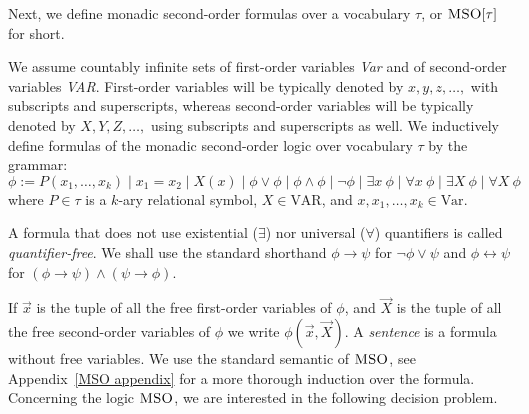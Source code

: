 \documentclass[a4paper,UKenglish,cleveref, autoref, thm-restate]{lipics-v2021}
\newcommand{\MSO}{\textsc{MSO}}
\begin{document}

Next, we deﬁne monadic second-order formulas over a vocabulary $\tau$, or $\MSO[\tau]$ for short. %

\begin{samepage}
\begin{definition}\label{MSO}
We assume countably infinite sets of first-order variables {\em Var}
and of second-order variables {\em VAR}. First-order variables
will be typically denoted by $x, y, z, \ldots,$ with subscripts and superscripts,
whereas second-order variables will be typically denoted by $X, Y, Z, \ldots ,$
using subscripts and superscripts as well. We
inductively define %
formulas of the monadic second-order logic
over vocabulary $\tau$ %
by the grammar:
$$ \phi :=  P(x_1 , \ldots , x_k) \mid x_1 = x_2 \mid X(x) 
		\mid \phi \vee \phi \mid \phi \wedge \phi \mid \neg \phi 
		\mid \exists x ~ \phi \mid  \forall x ~ \phi
		\mid \exists X ~ \phi \mid  \forall X ~ \phi		$$
where $P \in \tau$ is a $k$-ary relational symbol, $X \in \text{VAR}$, and $x, x_1, \ldots, x_k \in \text{Var}$.
\end{definition}
\end{samepage}

A formula that does not use existential ($\exists$) nor universal ($\forall$) quantiﬁers
is called {\em quantifier-free}.
%
%
We shall use the standard shorthand $\phi  \to \psi $ for $ \neg \phi \vee \psi $ 
and $\phi \leftrightarrow \psi $ for
$(\phi  \to \psi ) \wedge (\psi  \to \phi )$. 


If $\overrightarrow{x}$ is the tuple of all the free first-order variables of $\phi$,
and $\overrightarrow{X}$ is the tuple of all the free second-order variables of $\phi$ 
we write $\phi(\overrightarrow{x},\overrightarrow{X})$. A {\em sentence}
is a formula without free variables. We use the standard semantic of $\MSO$,
see Appendix~\ref{MSO appendix} for a more thorough induction over the formula.\\





Concerning the logic $\MSO$, we are interested in the following decision problem.
\end{document}
